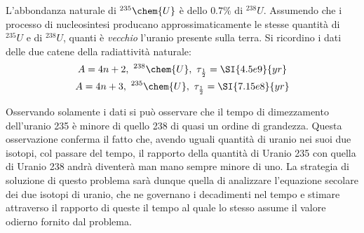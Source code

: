 \documentclass[../main.tex]{subfiles}
\begin{document}
	\begin{ese}[3.2]\label{ese:UDecay}
		L'abbondanza naturale di $ ^{235}\chem{U} $ è dello $ 0.7\% $ di $ ^{238}U $. Assumendo che i processo di nucleosintesi producano approssimaticamente le stesse quantità di $ ^{235}U $ e di $ ^{238}U $, quanti è \emph{vecchio} l'uranio presente sulla terra. Si ricordino i dati delle due catene della radiattività naturale:
		\begin{gather}
		A=4n+2,\ ^{238}\chem{U},\ \tau_{\frac{1}{2}}=\SI{4.5e9}{yr} \\
		A=4n+3,\ ^{235}\chem{U},\ \tau_{\frac{1}{2}}=\SI{7.15e8}{yr}
		\end{gather}
	\end{ese}
	\begin{svol}
		Osservando solamente i dati si può osservare che il tempo di dimezzamento dell'uranio 235 è minore di quello 238 di quasi un ordine di grandezza. Questa osservazione conferma il fatto che, avendo uguali quantità di uranio nei suoi due isotopi, col passare del tempo, il rapporto della quantità di Uranio 235 con quella di Uranio 238 andrà diventerà man mano sempre minore di uno. La strategia di soluzione di questo problema sarà dunque quella di analizzare l'equazione secolare dei due isotopi di uranio, che ne governano i decadimenti nel tempo e stimare attraverso il rapporto di queste il tempo al quale lo stesso assume il valore odierno fornito dal problema. 
		

\end{svol}
\end{document}
